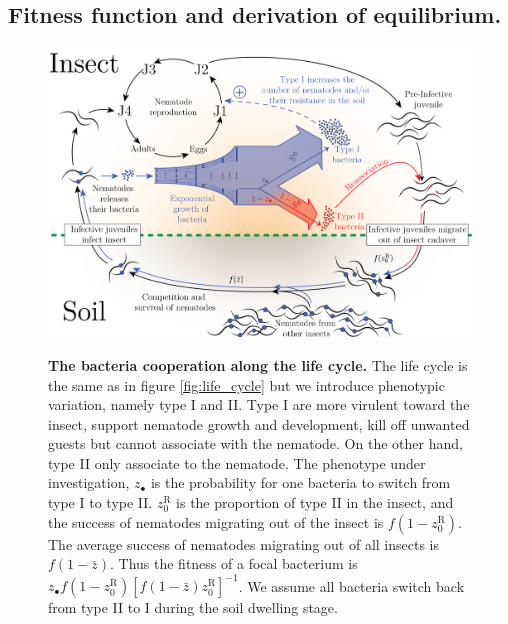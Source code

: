 \documentclass[10pt]{article}
\begin{document}
\begin{multicols}{2}
\section*{Fitness function and derivation of equilibrium.}
\begin{figure}[hbt!]
	  \centering
	  \label{fig:fitness}
       \includegraphics[width=14.0cm]{Figures/fitness.png}\\
		\caption{ \textbf{The bacteria cooperation along the life cycle.} The life cycle is the same as in figure \ref{fig:life_cycle} but we introduce phenotypic variation, namely type I and II. Type I are more virulent toward the insect, support nematode growth and development, kill off unwanted guests but cannot associate with the nematode. On the other hand, type II only associate to the nematode. The phenotype under investigation, $z_\bullet$ is the probability for one bacteria to switch from type I to type II. $z_0^{\mathrm{R}}$ is the proportion of type II in the insect, and the success of nematodes migrating out of the insect is $f(1- z_0^{\mathrm{R}})$. The average success of nematodes migrating out of all insects is $f(1- \bar{z})$. Thus the fitness of a focal bacterium is $z_\bullet f(1- z_0^{\mathrm{R}}) [f(1- \bar{z} ) z_0^{\mathrm{R}}]^{-1}$. We assume all bacteria switch back from type II to I during the soil dwelling stage.}
\end{figure}


\end{multicols}
\end{document}
